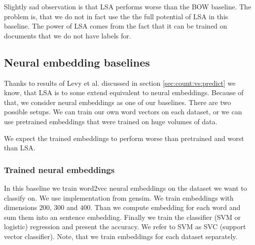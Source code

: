     Slightly sad observation is that LSA performs worse than the BOW baseline. 
    The problem is, that we do not in fact use the the full potential of LSA in this baseline.
    The power of LSA comes from the fact that it can be trained on documents that we do not have labels for.

    \subsection{Neural embedding baselines}
    
    Thanks to results of Levy et al.\cite{levy2014neural} discussed in section \ref{sec:count:vs:predict} we know, that LSA is to some extend equivalent to neural embeddings.
    Because of that, we consider neural embeddings as one of our baselines.
    There are two possible setups.
    We can train our own word vectors on each dataset, or we can use pretrained embeddings that were trained on huge volumes of data.
    
    We expect the trained embeddings to perform worse than pretrained and worst than LSA.
    
    \subsubsection{Trained neural embeddings}
    In this baseline we train word2vec neural embeddings on the dataset we want to classify on. 
    We use implementation  from gensim.
    We train embeddings with dimensions $200$, $300$ and $400$. 
    Than we compute embedding for each word and sum them into an sentence embedding.
    Finally we train the classifier (SVM or logistic) regression and present the accuracy.
    We refer to SVM as SVC (support vector classifier).
    Note, that we train embeddings for each dataset separately.

